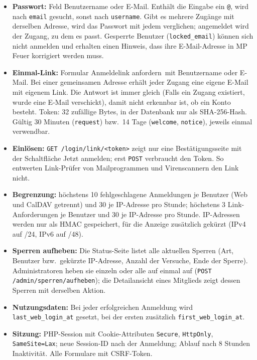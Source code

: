 \documentclass[a4paper,fontsize=10pt]{scrartcl}
\newcommand{\code}[1]{\texttt{#1}}
\begin{document}
\begin{itemize}
  \item \textbf{Passwort:} Feld \glqq Benutzername oder E-Mail\grqq. Enthält
        die Eingabe ein \code{@}, wird nach \code{email} gesucht, sonst nach
        \code{username}. Gibt es mehrere Zugänge mit derselben Adresse, wird
        das Passwort mit jedem verglichen; angemeldet wird der Zugang, zu dem
        es passt. Gesperrte Benutzer (\code{locked\_email}) können
        sich nicht anmelden und erhalten einen Hinweis, dass ihre
        E-Mail-Adresse in MP Feuer korrigiert werden muss.
  \item \textbf{Einmal-Link:} Formular \glqq Anmeldelink anfordern\grqq\ mit
        Benutzername oder E-Mail. Bei einer gemeinsamen Adresse erhält jeder
        Zugang eine eigene E-Mail mit eigenem Link. Die Antwort ist immer
        gleich (\glqq Falls ein Zugang existiert, wurde eine E-Mail
        verschickt\grqq), damit nicht erkennbar ist, ob ein Konto besteht.
        Token: 32 zufällige Bytes, in der Datenbank nur als SHA-256-Hash.
        Gültig 30 Minuten (\code{request}) bzw.\ 14 Tage (\code{welcome},
        \code{notice}), jeweils einmal verwendbar.
  \item \textbf{Einlösen:} \code{GET /login/link/<token>} zeigt nur eine
        Bestätigungsseite mit der Schaltfläche \glqq Jetzt anmelden\grqq;
        erst \code{POST} verbraucht den Token. So entwerten Link-Prüfer von
        Mailprogrammen und Virenscannern den Link nicht.
  \item \textbf{Begrenzung:} höchstens 10 fehlgeschlagene Anmeldungen je
        Benutzer (Web und CalDAV getrennt) und 30 je IP-Adresse pro Stunde;
        höchstens 3 Link-Anforderungen je Benutzer und 30 je IP-Adresse pro
        Stunde. IP-Adressen werden nur als HMAC gespeichert, für die Anzeige
        zusätzlich gekürzt (IPv4 auf /24, IPv6 auf /48).
  \item \textbf{Sperren aufheben:} Die Status-Seite listet alle aktuellen
        Sperren (Art, Benutzer bzw.\ gekürzte IP-Adresse, Anzahl der
        Versuche, Ende der Sperre). Administratoren heben sie einzeln oder
        alle auf einmal auf (\code{POST /admin/sperren/aufheben}); die
        Detailansicht eines Mitglieds zeigt dessen Sperren mit derselben
        Aktion.
  \item \textbf{Nutzungsdaten:} Bei jeder erfolgreichen Anmeldung wird
        \code{last\_web\_login\_at} gesetzt, bei der ersten zusätzlich
        \code{first\_web\_login\_at}.
  \item \textbf{Sitzung:} PHP-Session mit Cookie-Attributen \code{Secure},
        \code{HttpOnly}, \code{SameSite=Lax}; neue Session-ID nach der
        Anmeldung; Ablauf nach 8 Stunden Inaktivität. Alle Formulare mit
        CSRF-Token.
\end{itemize}
\end{document}
